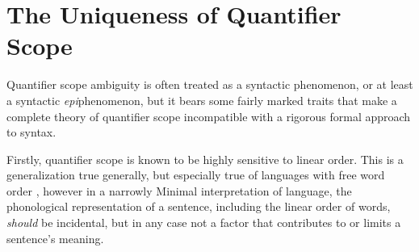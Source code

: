 \documentclass{article}
\begin{document}










\section{The Uniqueness of Quantifier Scope}

Quantifier scope ambiguity is often treated as a syntactic phenomenon, or at least a syntactic \emph{epi}phenomenon, but it bears some fairly marked traits that make a complete theory of quantifier scope incompatible with a rigorous formal approach to syntax.

Firstly, quantifier scope is known to be highly sensitive to linear order.
This is a generalization true generally, but especially true of languages with free word order
\parencite{karimi03,pafel04},
however in a narrowly Minimal interpretation of language, the phonological representation of a sentence, including the linear order of words, \emph{should} be incidental, but in any case not a factor that contributes to or limits a sentence's meaning.
\end{document}
